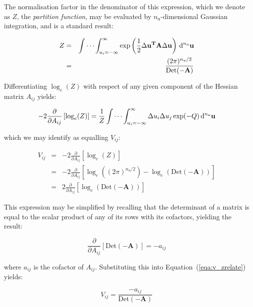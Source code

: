The normalisation factor in the denominator of this expression, which we denote
as $Z$, the \textit{partition function}, may be evaluated by
$n_\mathrm{u}$-dimensional Gaussian integration, and is a standard result:

\begin{eqnarray}
Z & = & \idotsint_{u_i=-\infty}^{\infty} \exp\left(\frac{1}{2} \Delta \mathbf{u}^\mathbf{T} \mathbf{A} \Delta \mathbf{u} \right) \,\mathrm{d}^{n_\mathrm{u}}\mathbf{u} \\
& = & \frac{(2\pi)^{n_\mathrm{u}/2}}{\mathrm{Det}(\mathbf{-A})} \nonumber
\end{eqnarray}

Differentiating $\log_e(Z)$ with respect of any given component of the Hessian
matrix $A_{ij}$ yields:

\begin{equation}
-2 \frac{\partial}{\partial A_{ij}} \left[ \log_e(Z) \right] = \frac{1}{Z}
\idotsint_{u_i=-\infty}^{\infty} \Delta u_i \Delta u_j \exp(-Q) \,\mathrm{d}^{n_\mathrm{u}}\mathbf{u}
\end{equation}

\noindent which we may identify as equalling $V_{ij}$:

\begin{eqnarray}
\label{eqa:v_zrelate}
V_{ij} & = & -2 \frac{\partial}{\partial A_{ij}} \left[ \log_e(Z) \right] \\
& = & -2 \frac{\partial}{\partial A_{ij}} \left[ \log_e((2\pi)^{n_\mathrm{u}/2}) - \log_e(\mathrm{Det}(\mathbf{-A})) \right] \nonumber \\
& = & 2 \frac{\partial}{\partial A_{ij}} \left[ \log_e(\mathrm{Det}(\mathbf{-A})) \right] \nonumber
\end{eqnarray}

\noindent This expression may be simplified by recalling that the determinant
of a matrix is equal to the scalar product of any of its rows with its
cofactors, yielding the result:

\begin{equation}
\frac{\partial}{\partial A_{ij}} \left[\mathrm{Det}(\mathbf{-A})\right] = -a_{ij}
\end{equation}

\noindent where $a_{ij}$ is the cofactor of $A_{ij}$. Substituting this into
Equation~(\ref{eqa:v_zrelate}) yields:

\begin{equation}
V_{ij} = \frac{-a_{ij}}{\mathrm{Det}(\mathbf{-A})}
\end{equation}

